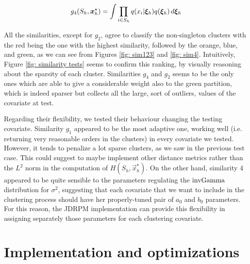 \documentclass[12pt,	%
	a4paper,		%
	twoside,		%
	openright,		%
	titlepage,%
	]{book}
\theoremstyle{definition}
\begin{document}
\begin{equation}    
g_4(S_h,\boldsymbol{x}_{h}^\star) = \int \prod_{i \in S_h} q(x_i|\boldsymbol{\xi}_h) q(\boldsymbol{\xi}_h) \, d\boldsymbol{\xi}_h
\end{equation}

All the similarities, except for $g_2$, agree to classify the non-singleton clusters with the red being the one with the highest similarity, followed by the orange, blue, and green, as we can see from Figures \ref{fig: sim123} and \ref{fig: sim4}. Intuitively, Figure \ref{fig: similarity tests} seems to confirm this ranking, by visually reasoning about the sparsity of each cluster. Similarities $g_4$ and $g_2$ seems to be the only ones which are able to give a considerable weight also to the green partition, which is indeed sparser but collects all the large, sort of outliers, values of the covariate at test.

Regarding their flexibility, we tested their behaviour changing the testing covariate. Similarity $g_1$ appeared to be the most adaptive one, working well (i.e. returning very reasonable orders in the clusters) in every covariate we tested. However, it tends to penalize a lot sparse clusters, as we saw in the previous test case. This could suggest to maybe implement other distance metrics rather than the $L^2$ norm in the computation of $H(S_h,\vec{x}_h^\star)$. On the other hand, similarity 4 appeared to be quite sensible to the parameters regulating the $\text{invGamma}$ distribution for $\sigma^2$, suggesting that each covariate that we want to include in the clustering process should have her properly-tuned pair of $a_0$ and $b_0$ parameters. For this reason, the JDRPM implementation can provide this flexibility in assigning separately those parameters for each clustering covariate. 


\chapter{Implementation and optimizations}
\label{Implementation and optimizations}
\end{document}

